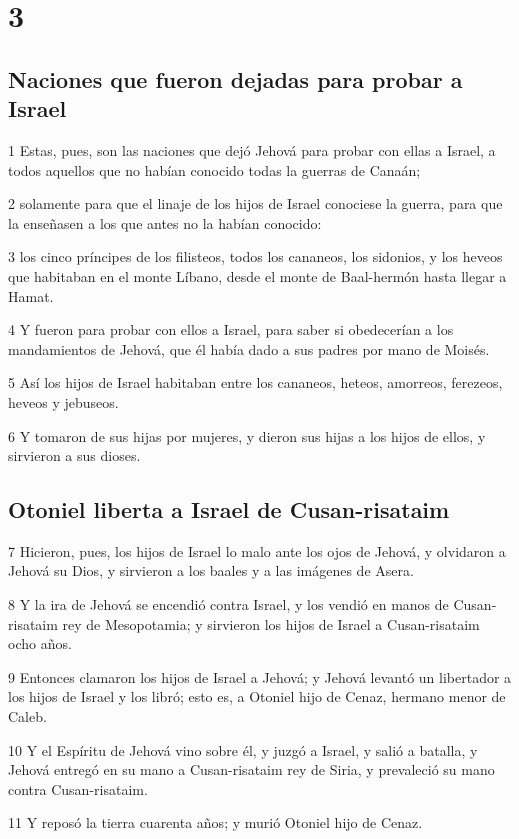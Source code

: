 \chapter{3}

\section*{Naciones que fueron dejadas para probar a Israel}

\par 1 Estas, pues, son las naciones que dejó Jehová para probar con ellas a Israel, a todos aquellos que no habían conocido todas la guerras de Canaán;
\par 2 solamente para que el linaje de los hijos de Israel conociese la guerra, para que la enseñasen a los que antes no la habían conocido:
\par 3 los cinco príncipes de los filisteos, todos los cananeos, los sidonios, y los heveos que habitaban en el monte Líbano, desde el monte de Baal-hermón hasta llegar a Hamat.
\par 4 Y fueron para probar con ellos a Israel, para saber si obedecerían a los mandamientos de Jehová, que él había dado a sus padres por mano de Moisés.
\par 5 Así los hijos de Israel habitaban entre los cananeos, heteos, amorreos, ferezeos, heveos y jebuseos.
\par 6 Y tomaron de sus hijas por mujeres, y dieron sus hijas a los hijos de ellos, y sirvieron a sus dioses.

\section*{Otoniel liberta a Israel de Cusan-risataim}

\par 7 Hicieron, pues, los hijos de Israel lo malo ante los ojos de Jehová, y olvidaron a Jehová su Dios, y sirvieron a los baales y a las imágenes de Asera.
\par 8 Y la ira de Jehová se encendió contra Israel, y los vendió en manos de Cusan-risataim rey de Mesopotamia; y sirvieron los hijos de Israel a Cusan-risataim ocho años.
\par 9 Entonces clamaron los hijos de Israel a Jehová; y Jehová levantó un libertador a los hijos de Israel y los libró; esto es, a Otoniel hijo de Cenaz, hermano menor de Caleb.
\par 10 Y el Espíritu de Jehová vino sobre él, y juzgó a Israel, y salió a batalla, y Jehová entregó en su mano a Cusan-risataim rey de Siria, y prevaleció su mano contra Cusan-risataim.
\par 11 Y reposó la tierra cuarenta años; y murió Otoniel hijo de Cenaz.

